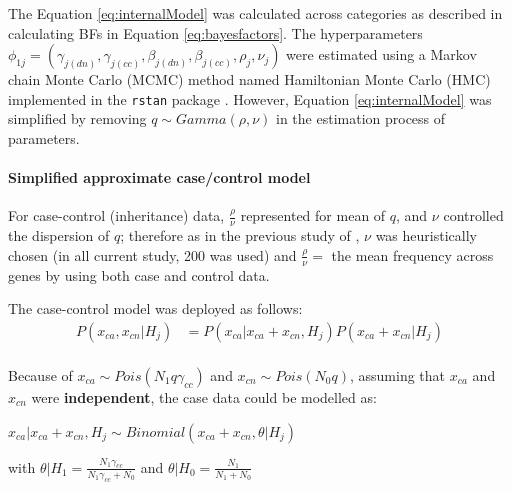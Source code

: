 \documentclass[]{article}
\begin{document}
The Equation \ref{eq:internalModel} was calculated across categories as
%
%
described in calculating BFs in Equation \ref{eq:bayesfactors}.
The hyperparameters $\phi_{1j} = (\gamma_{j(dn)}, \gamma_{j(cc)},
\beta_{j(dn)}, \beta_{j(cc)}, \rho_j, \nu_j) $ were estimated using a Markov chain
Monte Carlo (MCMC) method named Hamiltonian Monte Carlo (HMC)
implemented in the \texttt{rstan} package \citep{carpenter2015stan, r323manual}. However, Equation \ref{eq:internalModel} was simplified by removing $q \sim Gamma(\rho, \nu)$ in the estimation process of parameters.

\paragraph{Simplified approximate case/control model}

For case-control (inheritance) data, $\frac{\rho}{\nu}$ represented for mean of $q$, and $\nu$ controlled the
  dispersion of $q$; therefore as in the previous study
  of \cite{de2014synaptic}, $\nu$ was heuristically chosen (in all
  current study, 200 was used) and $\frac{\rho}{\nu} = $ the mean frequency across genes by
  using both case and control data.

The case-control model was deployed as follows:
\begin{equation}
\begin{array}{ll}
P(x_{ca}, x_{cn}|H_j) & = P(x_{ca}|x_{ca} + x_{cn}, H_j) P(x_{ca} + x_{cn}| H_j) \\
\end{array}
\end{equation}

Because of $x_{ca} \sim Pois(N_1 q \gamma_{cc})$ and $x_{cn} \sim
Pois(N_0 q)$, assuming that $x_{ca}$ and $x_{cn}$ were
\textbf{independent}, the case data could be modelled as:

$x_{ca}|x_{ca} + x_{cn}, H_j \sim Binomial(x_{ca} + x_{cn}, \theta|H_j)$

with $\theta|H_1 = \frac{N_1 \gamma_{cc}}{N_1 \gamma_{cc} + N_0}$ and $\theta |H_0 = \frac{N_1}{N_1 + N_0}$
\end{document}
